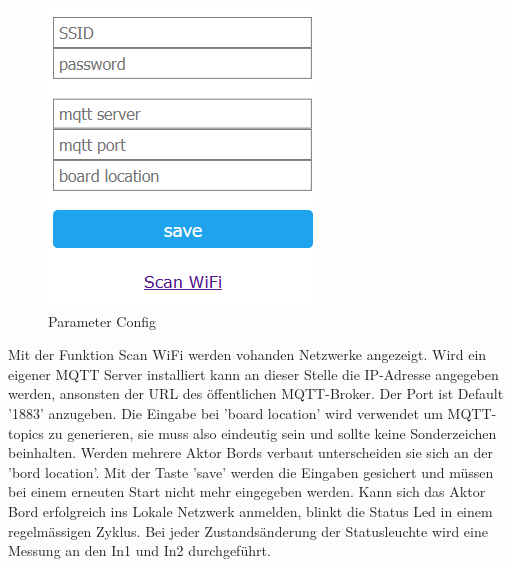 \begin{figure}[H]
\begin{center}
\begin{minipage}[b]{.3\linewidth}
		\includegraphics[width=\textwidth]{graphics/Configportal2.PNG}
		\caption{Parameter Config}
	\end{minipage}
\end{center}
\end{figure}
Mit der Funktion Scan WiFi werden vohanden Netzwerke angezeigt. Wird ein eigener MQTT Server installiert kann an dieser Stelle die IP-Adresse angegeben werden, ansonsten der URL des öffentlichen MQTT-Broker. Der Port ist Default '1883' anzugeben. Die Eingabe bei 'board location' wird verwendet um MQTT-topics zu generieren, sie muss also eindeutig sein und sollte keine Sonderzeichen beinhalten. Werden mehrere Aktor Bords verbaut unterscheiden sie sich an der 'bord location'. Mit der Taste 'save' werden die Eingaben gesichert und müssen bei einem erneuten Start nicht mehr eingegeben werden. Kann sich das Aktor Bord erfolgreich ins Lokale Netzwerk anmelden, blinkt die Status Led in einem regelmässigen Zyklus. Bei jeder Zustandsänderung der Statusleuchte wird eine Messung an den In1 und In2 durchgeführt. 

